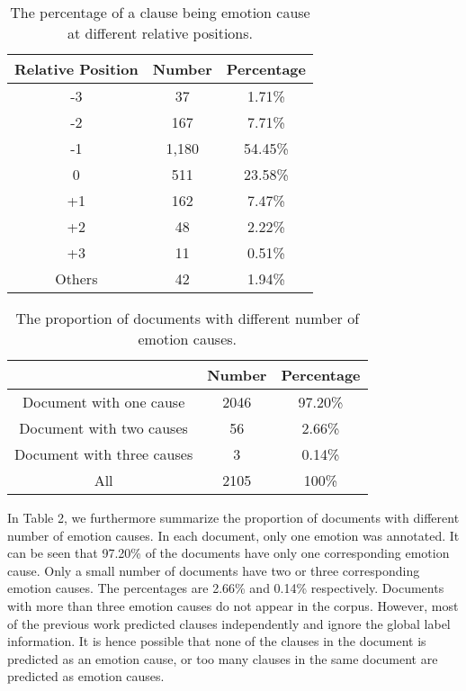 \documentclass[letterpaper]{article} \usepackage{aaai19}  \usepackage{times}  \usepackage{helvet}  \usepackage{courier}  \usepackage{url}  \usepackage{graphicx}  \frenchspacing  \setlength{\pdfpagewidth}{8.5in}  \setlength{\pdfpageheight}{11in}  \setcounter{secnumdepth}{0}
\begin{document}
\begin{table}
	
	\centering
	\caption{\label{font-table} The percentage of a clause being emotion cause at different relative positions. }
	\begin{tabular} {c|c|c}
		\hline  Relative Position & Number & Percentage\\
		\hline
		-3 & 37 & 1.71\% \\
		-2 &	167 &	7.71\% \\
		-1 &	1,180 &	54.45\% \\
		0 &	511 &	23.58\% \\
		+1 &	162 &	7.47\% \\
		+2	& 48 &	2.22\% \\
		+3	& 11 &	0.51\% \\
		Others &	42 &	1.94\% \\
		\hline
	\end{tabular}
	\label{tab:table1}
\end{table}

\begin{table}
	
	\centering
	\caption{\label{font-table} The proportion of documents with different number of emotion causes. }
	\begin{tabular} {c|c|c}
		\hline   & Number & Percentage\\
		\hline
		Document with one cause & 2046 & 97.20\% \\
		Document with two causes &	56 &	2.66\% \\
		Document with three causes &	3 &	0.14\% \\
		All &	2105 &	100\% \\
		\hline
	\end{tabular}
	\label{tab:table1}
\end{table}

In Table 2, we furthermore summarize the proportion of documents with different number of emotion causes. In each document, only one emotion was annotated. It can be seen that 97.20\% of the documents have only one corresponding emotion cause. Only a small number of documents have two or three corresponding emotion causes. The percentages are 2.66\% and 0.14\% respectively. Documents with more than three emotion causes do not appear in the corpus. However, most of the previous work predicted clauses independently and ignore the global label information. It is hence possible that none of the clauses in the document is predicted as an emotion cause, or too many clauses in the same document are predicted as emotion causes.
\end{document}
